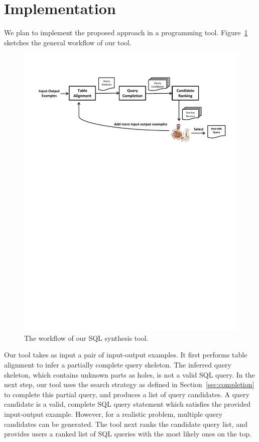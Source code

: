 
\section{Implementation}
\label{sec:implementation}

We plan to implement the proposed approach in a programming
tool. Figure~\ref{fig:workflow} sketches the general workflow
of our tool.

\begin{figure}[t]
  \centering
  \includegraphics[scale=0.46]{workflow}
  \vspace*{-5.0ex}\caption {{\label{fig:workflow} The workflow of our SQL synthesis tool.
}}
\end{figure}

Our tool takes as input a pair of input-output examples. It first performs
table alignment to infer a partially complete query skeleton. The inferred query
skeleton, which contains unknown parts as holes, is not a valid SQL query.
In the next step, our tool uses the search strategy as defined in Section~\ref{sec:completion}
to complete this partial query, and produces a list of query candidates.
A query candidate is a valid, complete SQL query statement which satisfies
the provided input-output example. However, for a realistic problem,
multiple query candidates can be generated. The tool next ranks the candidate
query list, and provides users a ranked list of SQL queries with the most likely
ones on the top.

